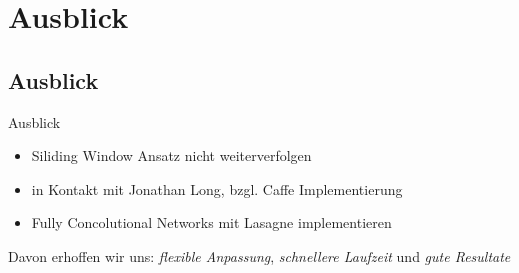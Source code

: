 \section{Ausblick}
\subsection{Ausblick}
\begin{frame}{Ausblick}
    \begin{itemize}
      \item Siliding Window Ansatz nicht weiterverfolgen
       \item in Kontakt mit Jonathan Long, bzgl. Caffe Implementierung
        \item Fully Concolutional Networks mit Lasagne implementieren
      
    \end{itemize}
    Davon erhoffen wir uns:
    \newline
    \rightarrow \emph{flexible Anpassung},  \emph{schnellere Laufzeit} und  \emph{gute Resultate}
\end{frame} 